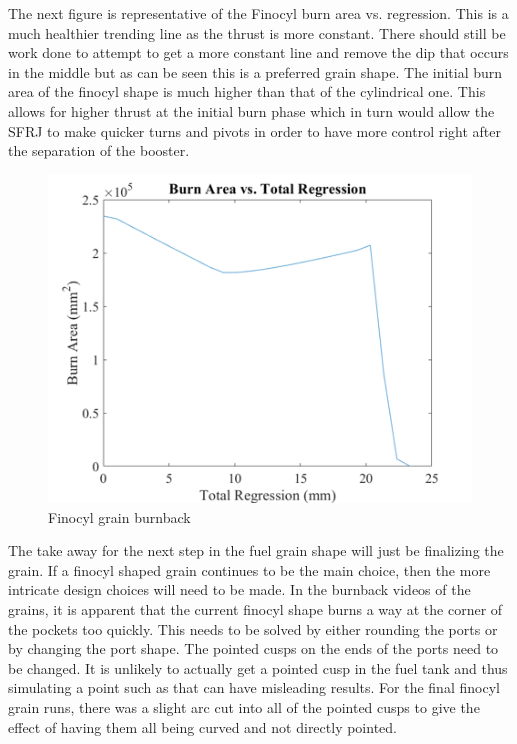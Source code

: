 The next figure is representative of the Finocyl burn area vs. regression. This is a much healthier trending line as the thrust is more constant. There should still be work done to attempt to get a more constant line and remove the dip that occurs in the middle but as can be seen this is a preferred grain shape. The initial burn area of the finocyl shape is much higher than that of the cylindrical one. This allows for higher thrust at the initial burn phase which in turn would allow the SFRJ to make quicker turns and pivots in order to have more control right after the separation of the booster.

\begin{figure}[H]
    \centering
    \includegraphics[width=0.7\linewidth]{CombustorDesign/finocylgrainburnback.png}
    \caption{Finocyl grain burnback}
    \label{fig:finocylGrainBurnback}
\end{figure}

The take away for the next step in the fuel grain shape will just be finalizing the grain. If a finocyl shaped grain continues to be the main choice, then the more intricate design choices will need to be made. In the burnback videos of the grains, it is apparent that the current finocyl shape burns a way at the corner of the pockets too quickly. This needs to be solved by either rounding the ports or by changing the port shape. The pointed cusps on the ends of the ports need to be changed. It is unlikely to actually get a pointed cusp in the fuel tank and thus simulating a point such as that can have misleading results. For the final finocyl grain runs, there was a slight arc cut into all of the pointed cusps to give the effect of having them all being curved and not directly pointed. 